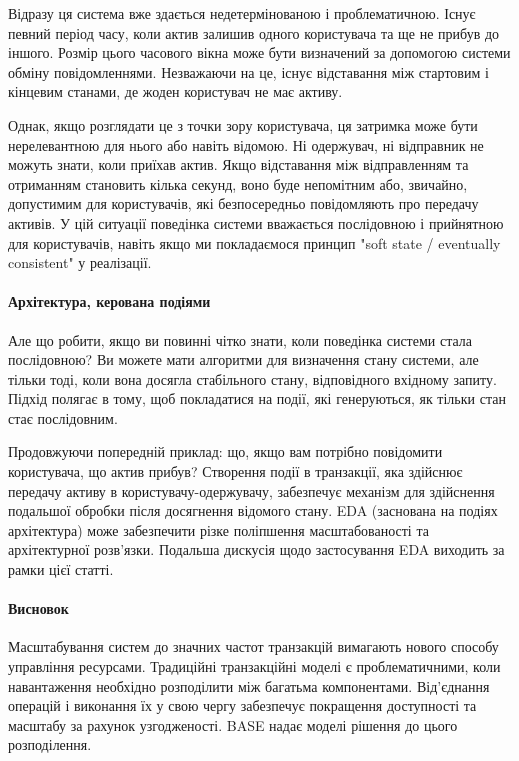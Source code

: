 \documentclass[14pt]{vakthesis}
\begin{document}
Відразу ця система вже здається недетермінованою і проблематичною. Існує певний період часу, коли актив залишив одного користувача та ще не прибув до іншого. Розмір цього часового вікна може бути визначений за допомогою системи обміну повідомленнями. 
Незважаючи на це, існує відставання між стартовим і кінцевим станами, де жоден користувач не має активу.

Однак, якщо розглядати це з точки зору користувача, ця затримка може бути нерелевантною для нього або навіть відомою. 
Ні одержувач, ні відправник не можуть знати, коли приїхав актив. 
Якщо відставання між відправленням та отриманням становить кілька секунд, воно буде непомітним або, звичайно, допустимим для користувачів, які безпосередньо повідомляють про передачу активів. У цій ситуації поведінка системи вважається послідовною і прийнятною для користувачів, навіть якщо ми покладаємося принцип
"soft state / eventually consistent" у реалізації.

\paragraph{Архітектура, керована подіями}

Але що робити, якщо ви повинні чітко знати, коли поведінка системи стала послідовною? 
Ви можете мати алгоритми для визначення стану системи, але тільки тоді, коли вона досягла стабільного стану, відповідного вхідному запиту. 
Підхід полягає в тому, щоб покладатися на події, які генеруються, як тільки стан стає послідовним.

Продовжуючи попередній приклад: що, якщо вам потрібно повідомити користувача, що актив прибув? Створення події в транзакції, яка здійснює передачу активу в користувачу-одержувачу, забезпечує механізм для здійснення подальшої обробки після досягнення відомого стану. EDA (заснована на подіях архітектура) може забезпечити різке поліпшення масштабованості та архітектурної розв'язки. Подальша дискусія щодо застосування EDA виходить за рамки цієї статті.

\paragraph{Висновок}

Масштабування систем до значних частот транзакцій вимагають нового способу управління ресурсами. 
Традиційні транзакційні моделі є проблематичними, коли навантаження необхідно розподілити між багатьма компонентами. Від'єднання операцій і виконання їх у свою чергу забезпечує покращення доступності та масштабу за рахунок узгодженості. BASE надає моделі рішення до цього розподілення.
\end{document}
